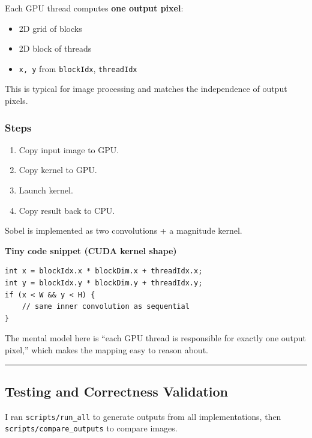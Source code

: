\documentclass[
]{article}
\providecommand{\tightlist}{%
  \setlength{\itemsep}{0pt}\setlength{\parskip}{0pt}}
\begin{document}
Each GPU thread computes \textbf{one output pixel}:

\begin{itemize}
\tightlist
\item
  2D grid of blocks
\item
  2D block of threads
\item
  \texttt{x,\ y} from \texttt{blockIdx}, \texttt{threadIdx}
\end{itemize}

This is typical for image processing and matches the independence of
output pixels.

\subsubsection{Steps}\label{steps}

\begin{enumerate}
\def\labelenumi{\arabic{enumi}.}
\tightlist
\item
  Copy input image to GPU.
\item
  Copy kernel to GPU.
\item
  Launch kernel.
\item
  Copy result back to CPU.
\end{enumerate}

Sobel is implemented as two convolutions + a magnitude kernel.

\textbf{Tiny code snippet (CUDA kernel shape)}

\begin{verbatim}
int x = blockIdx.x * blockDim.x + threadIdx.x;
int y = blockIdx.y * blockDim.y + threadIdx.y;
if (x < W && y < H) {
    // same inner convolution as sequential
}
\end{verbatim}

The mental model here is ``each GPU thread is responsible for exactly
one output pixel,'' which makes the mapping easy to reason about.

\begin{center}\rule{0.5\linewidth}{0.5pt}\end{center}

\subsection{Testing and Correctness
Validation}\label{testing-and-correctness-validation}

I ran \texttt{scripts/run\_all} to generate outputs from all
implementations, then \texttt{scripts/compare\_outputs} to compare
images.
\end{document}
